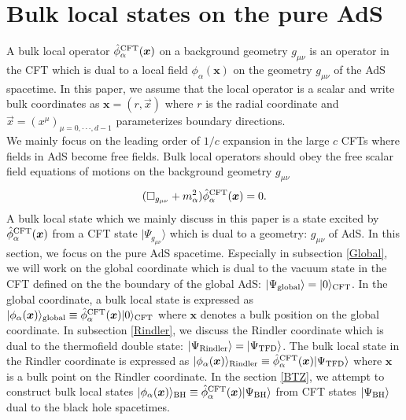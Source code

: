 \documentclass[11pt,a4paper]{article}
\def\a{{\alpha}}
\def\ba{\begin{eqnarray}}
\def\ea{\end{eqnarray}}
\def\ddd{\cdot\cdot\cdot}
\def\lb{\rangle}
\begin{document}
\newpage
\section{Bulk local states on the pure AdS}\label{sec1}
A bulk local operator $\hat{\phi}^{\rm CFT}_\a(\boldsymbol{x})$ on a background geometry $g_{\mu\nu}$ is an operator in the CFT which is dual to a local field $\phi_\a(\boldsymbol{x})$ on the geometry $g_{\mu\nu}$ of the AdS spacetime. In this paper, we assume that the local operator is a scalar and write bulk coordinates as $\boldsymbol{x}=(r,\vec{x})$ where $r$ is the radial coordinate and $\vec{x}=(x^\mu)_{\mu=0,\ddd,d-1}$ parameterizes boundary directions. \\
We mainly focus on the leading order of $1/c$ expansion in the large $c$ CFTs where fields in AdS become free fields. Bulk local operators should obey the free scalar field equations of motions on the background geometry $g_{\mu\nu}$
\ba
(\Box_{g_{\mu\nu}}+m^2_\a)\hat{\phi}^{\rm CFT}_\a(\boldsymbol{x})=0.\label{eq}
\ea
 A bulk local state which we mainly discuss in this paper is a state excited by $\hat{\phi}^{\rm CFT}_\a(\boldsymbol{x})$ from a CFT state $|\Psi_{g_{\mu\nu}}\lb$ which is dual to a geometry: $g_{\mu\nu}$ of  AdS.
In this section, we focus on the pure AdS spacetime.
 Especially in subsection \ref{Global}, we will work on the global coordinate which is dual to the vacuum state in the CFT defined on the the boundary of the global AdS: $|\Psi_{{\rm global}}\lb=|0\lb_{\rm CFT}$. In the global coordinate, a bulk local state is expressed as $|\phi_\a(\boldsymbol{x})\lb_{\rm global}\equiv \hat{\phi}^{\rm CFT}_\a(\boldsymbol{x})|0\lb_{\rm CFT}$ where $\boldsymbol{x}$ denotes a bulk position on the global coordinate. In subsection \ref{Rindler}, we discuss the Rindler coordinate which is dual to the thermofield double state: $|\Psi_{{\rm Rindler}}\lb=|\Psi_{\rm TFD}\lb$. The bulk local state in the Rindler coordinate is expressed as $|\phi_\a(\boldsymbol{x})\lb_{\rm Rindler}\equiv \hat{\phi}^{\rm CFT}_\a(\boldsymbol{x})|\Psi_{\rm TFD}\lb$ where $\boldsymbol{x}$ is a bulk point on the Rindler coordinate. In the section \ref{BTZ}, we attempt to construct bulk local states $|\phi_\a(\boldsymbol{x})\lb_{\rm BH}\equiv \hat{\phi}^{\rm CFT}_\a(\boldsymbol{x})|\Psi_{\rm BH}\lb$ from CFT states $|\Psi_{\rm BH}\lb$ dual to the black hole spacetimes.
\end{document}
